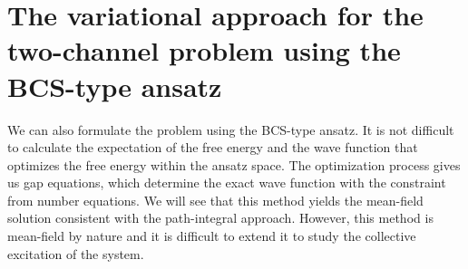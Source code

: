 \chapter{The variational approach for the two-channel problem using  the BCS-type ansatz\label{ch:mean}}
We can also formulate the problem  using the  BCS-type ansatz.  It is not difficult to calculate  the expectation of the free energy and  the wave function that optimizes the free energy within the ansatz space.  The optimization process gives us gap equations, which determine the exact wave function with the constraint from number equations.   %
We will see that this method yields  the mean-field solution consistent with the path-integral approach.  However, this method is mean-field by nature and it is difficult  to extend it to study the collective excitation of the system.  

